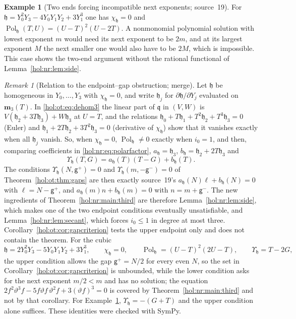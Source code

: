 \documentclass[11pt]{article}
\numberwithin{equation}{section}
\theoremstyle{definition}
\newtheorem{example}[theorem]{Example}
\theoremstyle{remark}
\newtheorem{remark}[theorem]{Remark}
\begin{document}
\begin{example}[Two ends forcing incompatible next exponents; source~19]
\label{hol:nr:ex:cubic}
For $\mathfrak h=Y_0^2Y_3-4Y_0Y_1Y_2+3Y_1^3$ one has $\chi_{\mathfrak h}=0$ and
$\operatorname{Pol}_{\mathfrak h}(T,U)=(U-T)^2(U-2T)$. A nonmonomial
polynomial solution with lowest exponent $m$ would need its next exponent to
be $2m$, and at its largest exponent $M$ the next smaller one would also have
to be $2M$, which is impossible. This case shows the two-end argument without
the rational functional of Lemma~\ref{hol:nr:lem:side}.
\end{example}

\begin{remark}[Relation to the endpoint--gap obstruction; merge]
\label{hol:nr:rem:gaps}
Let $\mathfrak h$ be homogeneous in $Y_0,\ldots,Y_3$ with $\chi_{\mathfrak h}=0$,
and write $\mathfrak h_j$ for $\partial\mathfrak h/\partial Y_j$ evaluated on
$\mathbf m_3(T)$. In \eqref{hol:ot:eq:dehom3} the linear part of $\mathfrak q$
in $(V,W)$ is $V(\mathfrak h_2+3T\mathfrak h_3)+W\mathfrak h_3$ at $U=T$, and
the relations $\mathfrak h_0+T\mathfrak h_1+T^2\mathfrak h_2+T^3\mathfrak h_3=0$
(Euler) and $\mathfrak h_1+2T\mathfrak h_2+3T^2\mathfrak h_3=0$ (derivative of
$\chi_{\mathfrak h}$) show that it vanishes exactly when all $\mathfrak h_j$
vanish. So, when $\chi_{\mathfrak h}=0$, $\operatorname{Pol}_{\mathfrak h}\ne0$
exactly when $i_0=1$, and then, comparing coefficients in
\eqref{hol:nr:eq:polarfactor}, $a_{\mathfrak h}=\mathfrak h_3$,
$b_{\mathfrak h}=\mathfrak h_2+2T\mathfrak h_3$ and
\[
 \Upsilon_{\mathfrak h}(T,G)=a_{\mathfrak h}(T)(T-G)+b_{\mathfrak h}(T).
\]
The conditions $\Upsilon_{\mathfrak h}(N,\mathsf g^+)=0$ and
$\Upsilon_{\mathfrak h}(m,-\mathsf g^-)=0$ of Theorem~\ref{hol:ot:thm:gaps} are
then exactly source~19's $a_{\mathfrak h}(N)\ell+b_{\mathfrak h}(N)=0$ with
$\ell=N-\mathsf g^+$, and $a_{\mathfrak h}(m)n+b_{\mathfrak h}(m)=0$ with
$n=m+\mathsf g^-$. The new ingredients of Theorem~\ref{hol:nr:main:third} are
therefore Lemma~\ref{hol:nr:lem:side}, which makes one of the two endpoint
conditions eventually unsatisfiable, and Lemma~\ref{hol:nr:lem:secant}, which
forces $i_0\le1$ in degree at most three. Corollary~\ref{hol:ot:cor:gapcriterion}
tests the upper endpoint only and does not contain the theorem. For the cubic
\[
 \mathfrak h=2Y_0^2Y_3-5Y_0Y_1Y_2+3Y_1^3,\qquad
 \chi_{\mathfrak h}=0,\qquad
 \operatorname{Pol}_{\mathfrak h}=(U-T)^2(2U-T),\qquad
 \Upsilon_{\mathfrak h}=T-2G,
\]
the upper condition allows the gap $\mathsf g^+=N/2$ for every even $N$, so the
set in Corollary~\ref{hol:ot:cor:gapcriterion} is unbounded, while the lower
condition asks for the next exponent $m/2<m$ and has no solution; the equation
$2f^2\vartheta^3f-5f\vartheta f\,\vartheta^2f+3(\vartheta f)^3=0$ is covered by
Theorem~\ref{hol:nr:main:third} and not by that corollary. For
Example~\ref{hol:nr:ex:cubic}, $\Upsilon_{\mathfrak h}=-(G+T)$ and the upper
condition alone suffices. These identities were checked with SymPy.
\end{remark}
\end{document}
